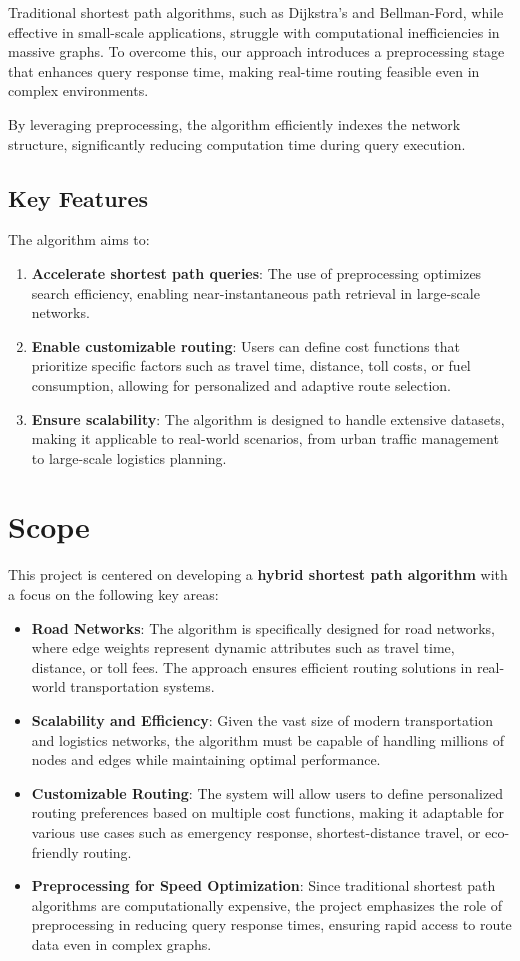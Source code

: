 	Traditional shortest path algorithms, such as Dijkstra’s and Bellman-Ford, while effective in small-scale applications, struggle with computational inefficiencies in massive graphs. To overcome this, our approach introduces a preprocessing stage that enhances query response time, making real-time routing feasible even in complex environments. \\ \medskip
	
	By leveraging preprocessing, the algorithm efficiently indexes the network structure, significantly reducing computation time during query execution.
	
	\subsection{Key Features}
	The algorithm aims to:
	\begin{enumerate}
		\item \textbf{Accelerate shortest path queries}: The use of preprocessing optimizes search efficiency, enabling near-instantaneous path retrieval in large-scale networks.
		\item \textbf{Enable customizable routing}: Users can define cost functions that prioritize specific factors such as travel time, distance, toll costs, or fuel consumption, allowing for personalized and adaptive route selection.
		\item \textbf{Ensure scalability}: The algorithm is designed to handle extensive datasets, making it applicable to real-world scenarios, from urban traffic management to large-scale logistics planning.
	\end{enumerate}
	
	\section{Scope}
	This project is centered on developing a \textbf{hybrid shortest path algorithm} with a focus on the following key areas:
	\begin{itemize}
		\item \textbf{Road Networks}: The algorithm is specifically designed for road networks, where edge weights represent dynamic attributes such as travel time, distance, or toll fees. The approach ensures efficient routing solutions in real-world transportation systems.
		\item \textbf{Scalability and Efficiency}: Given the vast size of modern transportation and logistics networks, the algorithm must be capable of handling millions of nodes and edges while maintaining optimal performance.
		\item \textbf{Customizable Routing}: The system will allow users to define personalized routing preferences based on multiple cost functions, making it adaptable for various use cases such as emergency response, shortest-distance travel, or eco-friendly routing.
		\item \textbf{Preprocessing for Speed Optimization}: Since traditional shortest path algorithms are computationally expensive, the project emphasizes the role of preprocessing in reducing query response times, ensuring rapid access to route data even in complex graphs.
	\end{itemize}

